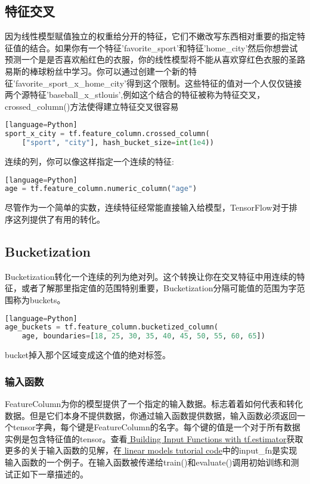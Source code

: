 \subsection{特征交叉}
因为线性模型赋值独立的权重给分开的特征，它们不嫩改写东西相对重要的指定特征值的结合。如果你有一个特征'favorite\_sport'和特征'home\_city'然后你想尝试预测一个是是否喜欢船红色的衣服，你的线性模型将不能从喜欢穿红色衣服的圣路易斯的棒球粉丝中学习。你可以通过创建一个新的特征'favorite\_sport\_x\_home\_city'得到这个限制。这些特征的值对一个人仅仅链接两个源特征'baseball\_x\_stlouis',例如这个结合的特征被称为特征交叉，crossed\_column()方法使得建立特征交叉很容易
\begin{lstlisting}[language=Python][language=Python]
sport_x_city = tf.feature_column.crossed_column(
    ["sport", "city"], hash_bucket_size=int(1e4))
\end{lstlisting}
连续的列，你可以像这样指定一个连续的特征:
\begin{lstlisting}[language=Python][language=Python]
age = tf.feature_column.numeric_column("age")
\end{lstlisting}
尽管作为一个简单的实数，连续特征经常能直接输入给模型，TensorFlow对于排序这列提供了有用的转化。
\subsection{Bucketization}
Bucketization转化一个连续的列为绝对列。这个转换让你在交叉特征中用连续的特征，或者了解那里指定值的范围特别重要，Bucketization分隔可能值的范围为字范围称为buckets。
\begin{lstlisting}[language=Python][language=Python]
age_buckets = tf.feature_column.bucketized_column(
    age, boundaries=[18, 25, 30, 35, 40, 45, 50, 55, 60, 65])
\end{lstlisting}
bucket掉入那个区域变成这个值的绝对标签。

\subsubsection{输入函数}
FeatureColumn为你的模型提供了一个指定的输入数据。标志着着如何代表和转化数据。但是它们本身不提供数据，你通过输入函数提供数据，输入函数必须返回一个tensor字典，每个键是FeatureColumn的名字。每个键的值是一个对于所有数据实例是包含特征值的tensor。查看\href{https://www.tensorflow.org/get_started/input_fn}{ Building Input Functions with tf.estimator}获取更多的关于输入函数的见解，在\href{https://www.github.com/tensorflow/tensorflow/blob/r1.3/tensorflow/examples/learn/wide_n_deep_tutorial.py}{ linear models tutorial code}中的input\_fn是实现输入函数的一个例子。在输入函数被传递给train()和evaluate()调用初始训练和测试正如下一章描述的。
